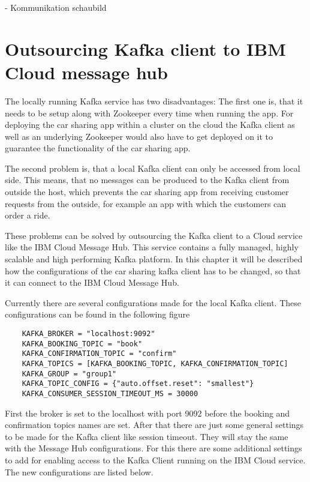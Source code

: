 

- Kommunikation schaubild

\section{Outsourcing Kafka client to IBM Cloud message hub}

The locally running Kafka service has two disadvantages: The first one is, that it needs to be setup along with Zookeeper every time when running the app. For deploying the car sharing app within a cluster on the cloud the Kafka client as well as an underlying Zookeeper would also have to get deployed on it to guarantee the functionality of the car sharing app.

The second problem is, that a local Kafka client can only be accessed from local side. This means, that no messages can be produced to the Kafka client from outside the host, which prevents the car sharing app from receiving customer requests from the outside, for example an app with which the customers can order a ride.

These problems can be solved by outsourcing the 	Kafka client to a Cloud service like the IBM Cloud Message Hub. This service contains a fully managed, highly scalable and high performing Kafka platform. In this chapter it will be described how the configurations of the car sharing kafka client has to be changed, so that it can connect to the IBM Cloud Message Hub.


Currently there are several configurations made for the local Kafka client. These configurations can be found in the following figure

\begin{lstlisting}
    KAFKA_BROKER = "localhost:9092"
    KAFKA_BOOKING_TOPIC = "book"
    KAFKA_CONFIRMATION_TOPIC = "confirm"
    KAFKA_TOPICS = [KAFKA_BOOKING_TOPIC, KAFKA_CONFIRMATION_TOPIC]
    KAFKA_GROUP = "group1"
    KAFKA_TOPIC_CONFIG = {"auto.offset.reset": "smallest"}
    KAFKA_CONSUMER_SESSION_TIMEOUT_MS = 30000
\end{lstlisting}

First the broker is set to the localhost with port 9092 before the booking and confirmation topics names are set. After that there are just some general settings to be made for the Kafka client like session timeout. They will stay the same with the Message Hub configurations. For this there are some additional settings to add for enabling access to the Kafka Client running on the IBM Cloud service. The new configurations are listed below.

